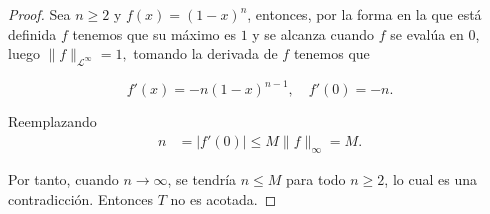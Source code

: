 \begin{enumerate}
\begin{sol}
\begin{proof}
Sea $n \geq 2$ y $f(x) = (1 - x)^n$,  entonces, por la forma en la que está definida $f$ tenemos que su máximo es $1$ y se alcanza cuando $f$ se evalúa en $0$, luego $
\|f\|_{\mathcal{L}^\infty} = 1,$ tomando la derivada de $f$ tenemos que

$$
f'(x) = -n(1 - x)^{n - 1}, \quad f'(0) = -n.
$$

Reemplazando
\begin{align*}
n &= |f'(0)| \leq M \|f\|_\infty = M.
\end{align*}

Por tanto, cuando $n \to \infty$, se tendría $n \leq M$ para todo $n \geq 2$, lo cual es una contradicción. Entonces $T$ no es acotada.

\end{proof}
        
\end{sol}
\end{enumerate}
\newpage

